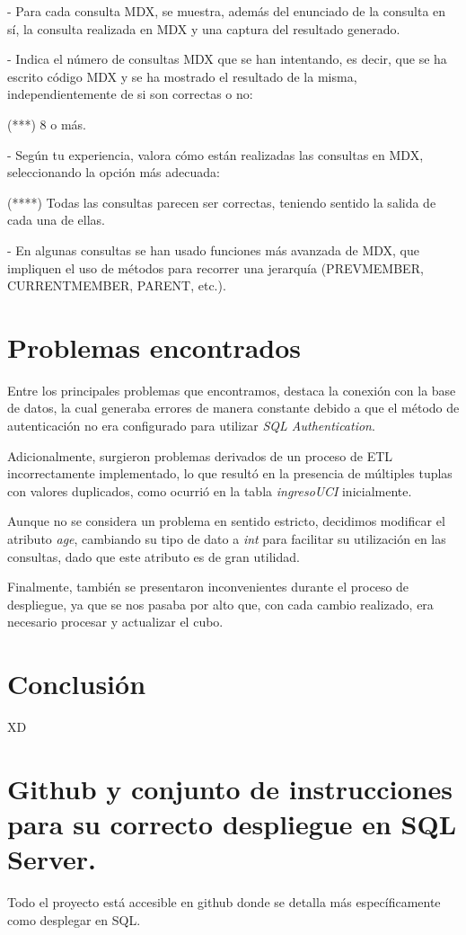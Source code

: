 \documentclass[12pt, a4paper, twoside]{article}
\begin{document}
	
		- Para cada consulta MDX, se muestra, además del enunciado de la consulta en sí, la consulta realizada en MDX y una captura del resultado generado.
	
	- Indica el número de consultas MDX que se han intentando, es decir, que se ha escrito código MDX y se ha mostrado el resultado de la misma, independientemente de si son correctas o no:
	
	(***) 8 o más.
	
	
	- Según tu experiencia, valora cómo están realizadas las consultas en MDX, seleccionando la opción más adecuada:
	
	(****) Todas las consultas parecen ser correctas, teniendo sentido la salida de cada una de ellas. 
	
	
	- En algunas consultas se han usado funciones más avanzada de MDX, que impliquen el uso de métodos para recorrer una jerarquía (PREVMEMBER, CURRENTMEMBER, PARENT, etc.). 

	\section{Problemas encontrados}

	Entre los principales problemas que encontramos, destaca la conexión con la base de datos, la cual generaba errores de manera constante debido a que el método de autenticación no era configurado para utilizar \textit{SQL Authentication}.
	
	Adicionalmente, surgieron problemas derivados de un proceso de ETL incorrectamente implementado, lo que resultó en la presencia de múltiples tuplas con valores duplicados, como ocurrió en la tabla \textit{ingresoUCI} inicialmente.
	
	Aunque no se considera un problema en sentido estricto, decidimos modificar el atributo \textit{age}, cambiando su tipo de dato a \textit{int} para facilitar su utilización en las consultas, dado que este atributo es de gran utilidad.
	
	Finalmente, también se presentaron inconvenientes durante el proceso de despliegue, ya que se nos pasaba por alto que, con cada cambio realizado, era necesario procesar y actualizar el cubo.
	

	\section{Conclusión}
	
	XD


	\section{Github y conjunto de instrucciones para su correcto despliegue en SQL Server.}

	Todo el proyecto está accesible en github \cite{depab2024} donde se detalla más específicamente como desplegar en SQL.
	\printbibliography
	
	
	
	
\end{document}
